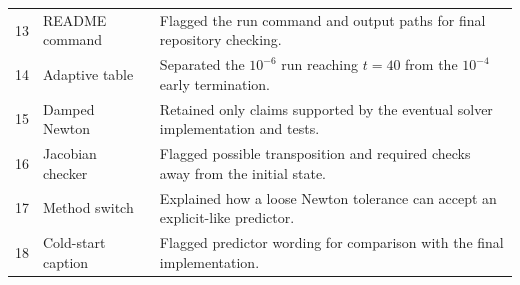 \begin{longtable}{p{}p{}p{}}
13&README command&Flagged the run command and output paths for final repository checking.\\
14&Adaptive table&Separated the $10^{-6}$ run reaching $t=40$ from the $10^{-4}$ early termination.\\
15&Damped Newton&Retained only claims supported by the eventual solver implementation and tests.\\
16&Jacobian checker&Flagged possible transposition and required checks away from the initial state.\\
17&Method switch&Explained how a loose Newton tolerance can accept an explicit-like predictor.\\
18&Cold-start caption&Flagged predictor wording for comparison with the final implementation.\\
\bottomrule
\end{longtable}
\normalsize
